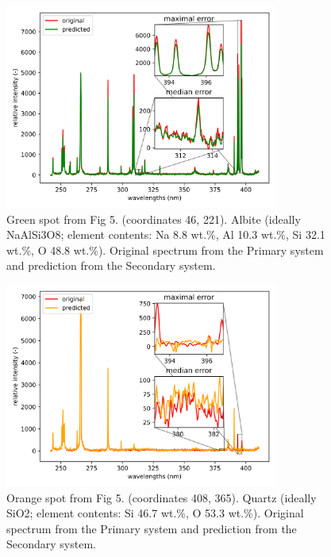 \documentclass[preprint,11pt]{elsarticle}
\begin{document}
\begin{figure}[!htb]
    \centering
    \includegraphics[width=0.8\textwidth]{spectra_sample_green.png}
    \caption{Green spot from Fig 5. (coordinates 46, 221). Albite (ideally NaAlSi3O8; element contents: Na 8.8 wt.\%, Al 10.3 wt.\%, Si 32.1 wt.\%, O 48.8 wt.\%). Original spectrum from the Primary system and prediction from the Secondary system.}
    \label{fig:green}
\end{figure}

\begin{figure}[!htb]
    \centering
    \includegraphics[width=0.8\textwidth]{spectra_sample_orange.png}
    \caption{Orange spot from Fig 5. (coordinates 408, 365). Quartz (ideally SiO2; element contents: Si 46.7 wt.\%, O 53.3 wt.\%). Original spectrum from the Primary system and prediction from the Secondary system.}
    \label{fig:orange}
\end{figure}
\end{document}
